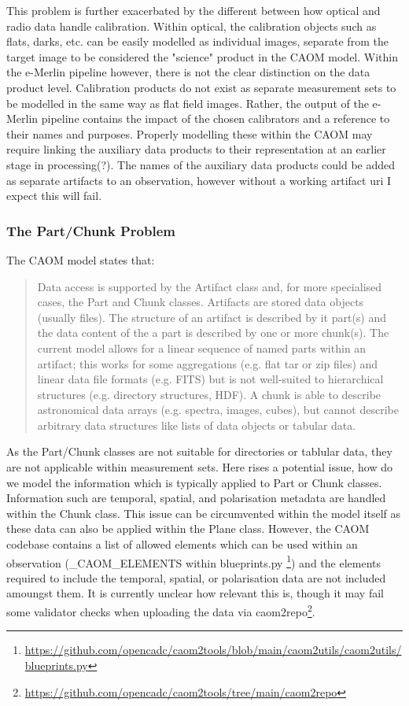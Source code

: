 This problem is further exacerbated by the different between how optical and radio data handle calibration.
Within optical, the calibration objects such as flats, darks, etc. can be easily modelled as individual images, separate from the target image to be considered the "science" product in the CAOM model.
Within the e-Merlin pipeline however, there is not the clear distinction on the data product level. 
Calibration products do not exist as separate measurement sets to be modelled in the same way as flat field images.
Rather, the output of the e-Merlin pipeline contains the impact of the chosen calibrators and a reference to their names and purposes. 
Properly modelling these within the CAOM may require linking the auxiliary data products to their representation at an earlier stage in processing(?). 
The names of the auxiliary data products could be added as separate artifacts to an observation, however without a working artifact uri I expect this will fail. 

\subsubsection{The Part/Chunk Problem}

The CAOM model states that:

\begin{quote}
    Data access is supported by the Artifact class and, for more specialised cases, the Part and Chunk classes. Artifacts are stored data objects (usually files). The structure of an artifact is described by it part(s) and the data content of the a part is described by one or more chunk(s). The current model allows for a linear sequence of named parts within an artifact; this works for some aggregations (e.g. flat tar or zip files) and linear data file formats (e.g. FITS) but is not well-suited to hierarchical structures (e.g. directory structures, HDF). A chunk is able to describe astronomical data arrays (e.g. spectra, images, cubes), but cannot describe arbitrary data structures like lists of data objects or tabular data. 
\end{quote}

As the Part/Chunk classes are not suitable for directories or tablular data, they are not applicable within measurement sets.
Here rises a potential issue, how do we model the information which is typically applied to Part or Chunk classes.
Information such are temporal, spatial, and polarisation metadata are handled within the Chunk class.
This issue can be circumvented within the model itself as these data can also be applied within the Plane class. 
However, the CAOM codebase contains a list of allowed elements which can be used within an observation (\_CAOM\_ELEMENTS within blueprints.py \footnote{\url{https://github.com/opencadc/caom2tools/blob/main/caom2utils/caom2utils/blueprints.py}}) and the elements required to include the temporal, spatial, or polarisation data are not included amoungst them.
It is currently unclear how relevant this is, though it may fail some validator checks when uploading the data via caom2repo\footnote{\url{https://github.com/opencadc/caom2tools/tree/main/caom2repo}}.


